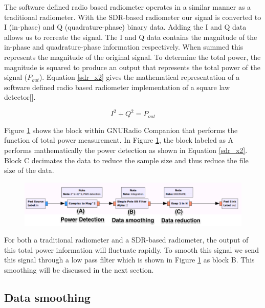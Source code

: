 The software defined radio based radiometer operates in a similar manner as a traditional radiometer.  With the SDR-based radiometer our signal is converted to I (in-phase) and Q (quadrature-phase) binary data.  Adding the I and Q data allows us to recreate the signal.  The I and Q data contains the magnitude of the in-phase and quadrature-phase information respectively.  When summed this represents the magnitude of the original signal.  To determine the total power, the magnitude is squared to produce an output that represents the total power of the signal ($P_{out}$).  Equation \ref{sdr_x2} gives the mathematical representation of a software defined radio based radiometer implementation of a square law detector[\cite{Rashid}]. 

\begin{equation}\label{sdr_x2}
I^2+Q^2 = P_{out}
\end{equation}

Figure \ref{square_block} shows the block within GNURadio Companion that performs the function of total power measurement.  In Figure \ref{square_block}, the block labeled as A performs mathematically the power detection as shown in Equation \ref{sdr_x2}.  Block C decimates the data to reduce the sample size and thus reduce the file size of the data.  

{\begin{figure}[h!tb] 
\centering
\includegraphics[width=17cm]{Images/TPR_grc.pdf}
\label{square_block}
\end{figure}
}

For both a traditional radiometer and a SDR-based radiometer, the output of this total power information will fluctuate rapidly.  To smooth this signal we send this signal through a low pass filter which is shown in Figure \ref{square_block} as block B.  This smoothing will be discussed in the next section.

\subsection{Data smoothing}\label{smoothing}

